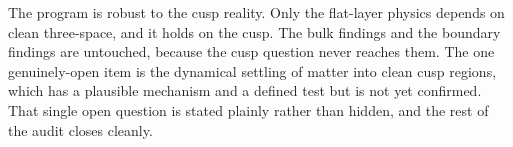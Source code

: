 The program is robust to the cusp reality. Only the flat-layer physics depends on clean three-space, and it holds
on the cusp. The bulk findings and the boundary findings are untouched, because the cusp question never reaches
them. The one genuinely-open item is the dynamical settling of matter into clean cusp regions, which has a
plausible mechanism and a defined test but is not yet confirmed. That single open question is stated plainly
rather than hidden, and the rest of the audit closes cleanly.
